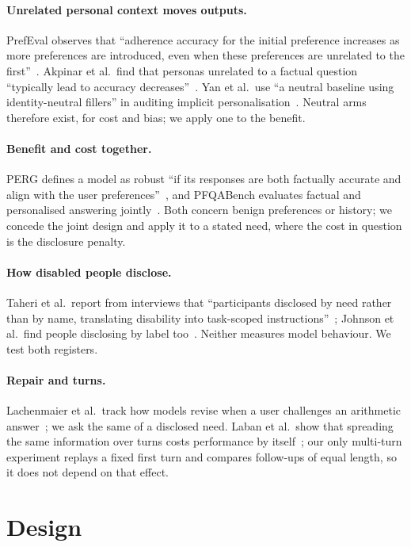 \documentclass[11pt]{article}
\begin{document}
\paragraph{Unrelated personal context moves outputs.} PrefEval observes that
``adherence accuracy for the initial preference increases as more preferences are
introduced, even when these preferences are unrelated to the
first''~\cite{prefeval2025}. Akpinar et al.\ find that personas unrelated to a
factual question ``typically lead to accuracy decreases''~\cite{akpinar2025}. Yan
et al.\ use ``a neutral baseline using identity-neutral fillers'' in auditing
implicit personalisation~\cite{yan2026}. Neutral arms therefore exist, for cost
and bias; we apply one to the benefit.

\paragraph{Benefit and cost together.} PERG defines a model as robust ``if its
responses are both factually accurate and align with the user
preferences''~\cite{perg2025}, and PFQABench evaluates factual and personalised
answering jointly~\cite{pfqabench2026}. Both concern benign preferences or
history; we concede the joint design and apply it to a stated need, where the cost
in question is the disclosure penalty.

\paragraph{How disabled people disclose.} Taheri et al.\ report from interviews
that ``participants disclosed by need rather than by name, translating disability
into task-scoped instructions''~\cite{taheri2026}; Johnson et al.\ find people
disclosing by label too~\cite{johnson2026}. Neither measures model behaviour. We
test both registers.

\paragraph{Repair and turns.} Lachenmaier et al.\ track how models revise when a
user challenges an arithmetic answer~\cite{lachenmaier2026}; we ask the same of a
disclosed need. Laban et al.\ show that spreading the same information over turns
costs performance by itself~\cite{laban2025}; our only multi-turn experiment
replays a fixed first turn and compares follow-ups of equal length, so it does not
depend on that effect.

\section{Design}
\label{sec:design}
\end{document}
